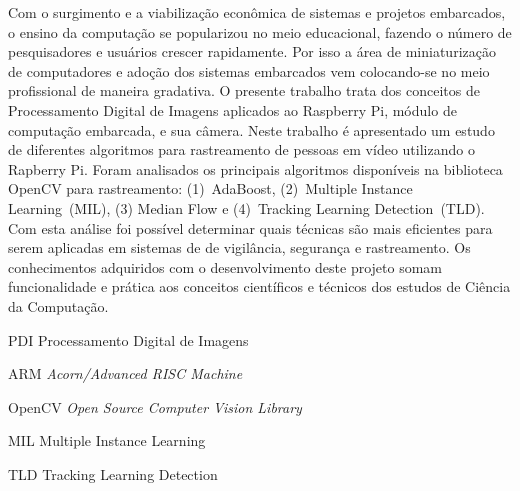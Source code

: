 \documentclass[12pt,oneside,a4paper,chapter=TITLE,section=TITLE,sumario=tradicional]{abntex2}
\begin{document}

\imprimircapa
\imprimirfolhaderosto

\begin{resumo}
Com o surgimento e a viabilização econômica de sistemas e projetos embarcados, o ensino da computação se popularizou no meio educacional, fazendo o número de pesquisadores e usuários crescer rapidamente. Por isso a área de miniaturização de computadores e adoção dos sistemas embarcados vem colocando-se no meio profissional de maneira gradativa. O presente trabalho trata dos conceitos de Processamento Digital de Imagens aplicados ao Raspberry Pi, módulo de computação embarcada, e sua câmera. 
Neste trabalho é apresentado um estudo de diferentes algoritmos para rastreamento de pessoas em vídeo utilizando o Rapberry Pi. Foram analisados os principais algoritmos disponíveis na biblioteca OpenCV para rastreamento: (1)~AdaBoost, (2)~Multiple Instance Learning~(MIL), (3) Median Flow e (4)~Tracking Learning Detection~(TLD). Com esta análise foi possível determinar quais técnicas são mais eficientes para serem aplicadas em sistemas de de vigilância, segurança e rastreamento. Os conhecimentos adquiridos com o desenvolvimento deste projeto somam funcionalidade e prática aos conceitos científicos e técnicos dos estudos de Ciência da Computação.

\end{resumo}

\listadefiguras
\listadequadros
\listadecodigos

\begin{siglas}
  \item[PDI] Processamento Digital de Imagens
  \item[ARM] \textit{Acorn/Advanced RISC Machine}
  \item[OpenCV] \textit{Open Source Computer Vision Library}
  \item[MIL] Multiple Instance Learning
  \item[TLD] Tracking Learning Detection 
\end{siglas}
\end{document}
